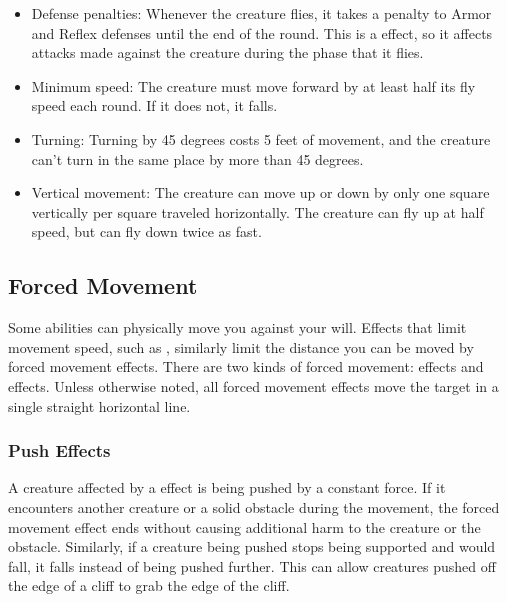             \begin{itemize}
                \item Defense penalties: Whenever the creature flies, it takes a  penalty to Armor and Reflex defenses until the end of the round.
                    This is a  effect, so it affects attacks made against the creature during the phase that it flies.
                \item Minimum speed: The creature must move forward by at least half its fly speed each round. If it does not, it falls.
                \item Turning: Turning by 45 degrees costs 5 feet of movement, and the creature can't turn in the same place by more than 45 degrees.
                \item Vertical movement: The creature can move up or down by only one square vertically per square traveled horizontally.
                    The creature can fly up at half speed, but can fly down twice as fast.
            \end{itemize}

        

    \subsection{Forced Movement}\label{Forced Movement}
        Some abilities can physically move you against your will.
        Effects that limit movement speed, such as , similarly limit the distance you can be moved by forced movement effects.
        There are two kinds of forced movement:  effects and  effects.
        Unless otherwise noted, all forced movement effects move the target in a single straight horizontal line.

        \subsubsection{Push Effects}\label{Push Effects}
            A creature affected by a  effect is being pushed by a constant force.
            If it encounters another creature or a solid obstacle during the movement, the forced movement effect ends without causing additional harm to the creature or the obstacle.
            Similarly, if a creature being pushed stops being supported and would fall, it falls instead of being pushed further.
            This can allow creatures pushed off the edge of a cliff to grab the edge of the cliff.

